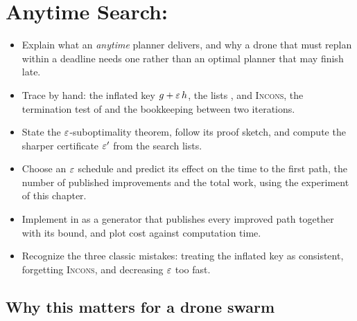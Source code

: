 \chapter{Anytime Search: \arastar}
\label{ch:ch06}

\begin{objectives}
\begin{itemize}
  \item Explain what an \emph{anytime} planner delivers, and why a drone that must replan within a deadline needs one rather than an optimal planner that may finish late.
  \item Trace \arastar by hand: the inflated key $g + \varepsilon\,h$, the lists \Open, \Closed and \textsc{Incons}, the termination test of \AraImprovePath and the bookkeeping between two iterations.
  \item State the $\varepsilon$-suboptimality theorem, follow its proof sketch, and compute the sharper certificate $\varepsilon'$ from the search lists.
  \item Choose an $\varepsilon$ schedule and predict its effect on the time to the first path, the number of published improvements and the total work, using the experiment of this chapter.
  \item Implement \arastar in \python as a generator that publishes every improved path together with its bound, and plot cost against computation time.
  \item Recognize the three classic mistakes: treating the inflated key as consistent, forgetting \textsc{Incons}, and decreasing $\varepsilon$ too fast.
\end{itemize}
\end{objectives}

\section{Why this matters for a drone swarm}
\label{sec:ch06-motivation}

